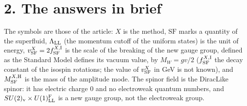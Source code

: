 \documentclass[
  10pt,
]{article}
\begin{document}
\hypertarget{the-answers-in-brief}{%
\section{2. The answers in brief}\label{the-answers-in-brief}}

The symbols are those of the article: \(X\) is the method,
\(\mathrm{SF}\) marks a quantity of the superfluid, \(\Lambda_{\rm LL}\)
(the momentum cutoff of the uniform states) is the unit of energy,
\(v^X_{\rm SF}=2f^{X,{\rm I}}_{\rm SF}\) is the scale of the breaking of
the new gauge group, defined as the Standard Model defines its vacuum
value, by \(M_W=gv/2\) (\(f^{X,{\rm I}}_{\rm SF}\) the decay constant of
the isospin rotations; the value of \(v^X_{\rm SF}\) in GeV is not
known), and \(M^{X,{\rm H}}_{\rm SF}\) is the mass of the amplitude
mode. The spinor field is the DiracLike spinor: it has electric charge 0
and no electroweak quantum numbers, and
\(SU(2)_{\rm v}\times U(1)^{\rm F}_{\rm LL}\) is a new gauge group, not
the electroweak group.
\end{document}
